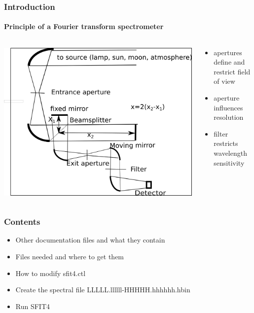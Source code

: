 \documentclass[notes=hide]{beamer}
\begin{document}
\begin{frame}
  \frametitle{Introduction}
  \framesubtitle{Principle of a Fourier transform spectrometer}
  \begin{columns}
    \begin{column}{0.6\textwidth}
      \includegraphics[width=1.2\textwidth,height=0.8\textheight]{Principle-fts.png}
    \end{column}
    \begin{column}{0.4\textwidth}
      \vspace{-2cm}
      \begin{itemize}
      \item apertures define and restrict field of view
      \item aperture influences resolution
      \item filter restricts wavelength sensitivity
      \end{itemize}
     \end{column}
    \end{columns}
\end{frame}


\begin{frame}
  \frametitle{Contents}
  \begin{itemize}
  \item Other documentation files and what they contain
  \item Files needed and where to get them
  \item How to modify sfit4.ctl
  \item Create the spectral file LLLLL.llllll-HHHHH.hhhhhh.hbin
  \item Run SFIT4
  \end{itemize}
\end{frame}
\end{document}
